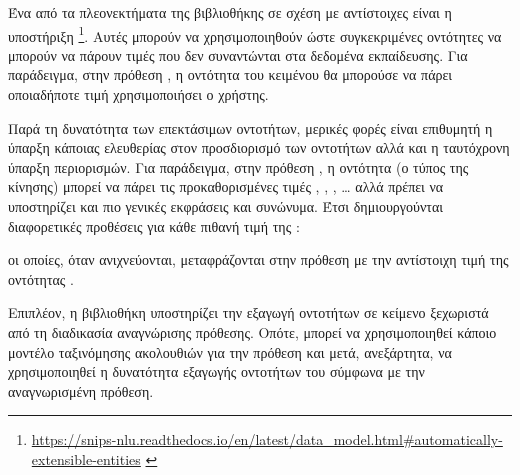 Ένα από τα πλεονεκτήματα της βιβλιοθήκης σε σχέση με αντίστοιχες είναι η υποστήριξη \footnote{%
    \begingroup%
    \def\UrlBigBreaks{\do\/\do-\do:}%
    \url{https://snips-nlu.readthedocs.io/en/latest/data_model.html\#automatically-extensible-entities}%
    \endgroup%
}.
Αυτές μπορούν να χρησιμοποιηθούν ώστε συγκεκριμένες οντότητες να μπορούν να πάρουν τιμές που δεν συναντώνται στα δεδομένα εκπαίδευσης.
Για παράδειγμα, στην πρόθεση , η οντότητα του κειμένου  θα μπορούσε να πάρει οποιαδήποτε τιμή χρησιμοποιήσει ο χρήστης.

Παρά τη δυνατότητα των επεκτάσιμων οντοτήτων, μερικές φορές είναι επιθυμητή η ύπαρξη κάποιας ελευθερίας στον προσδιορισμό των οντοτήτων αλλά και η ταυτόχρονη ύπαρξη περιορισμών.
Για παράδειγμα, στην πρόθεση , η οντότητα  (ο τύπος της κίνησης) μπορεί να πάρει τις προκαθορισμένες τιμές , , , \ldots{} αλλά πρέπει να υποστηρίζει και πιο γενικές εκφράσεις και συνώνυμα.
Έτσι δημιουργούνται διαφορετικές προθέσεις για κάθε πιθανή τιμή της :
\begin{compactenum}
    \item {}
    \item {}
    \item {}
    \item {}
    \item {}
    \item {}
\end{compactenum}
οι οποίες, όταν ανιχνεύονται, μεταφράζονται στην πρόθεση  με την αντίστοιχη τιμή της οντότητας .

Επιπλέον, η βιβλιοθήκη υποστηρίζει την εξαγωγή οντοτήτων σε κείμενο ξεχωριστά από τη διαδικασία αναγνώρισης πρόθεσης.
Οπότε, μπορεί να χρησιμοποιηθεί κάποιο μοντέλο ταξινόμησης ακολουθιών για την πρόθεση και μετά, ανεξάρτητα, να χρησιμοποιηθεί η δυνατότητα εξαγωγής οντοτήτων του  σύμφωνα με την αναγνωρισμένη πρόθεση.

